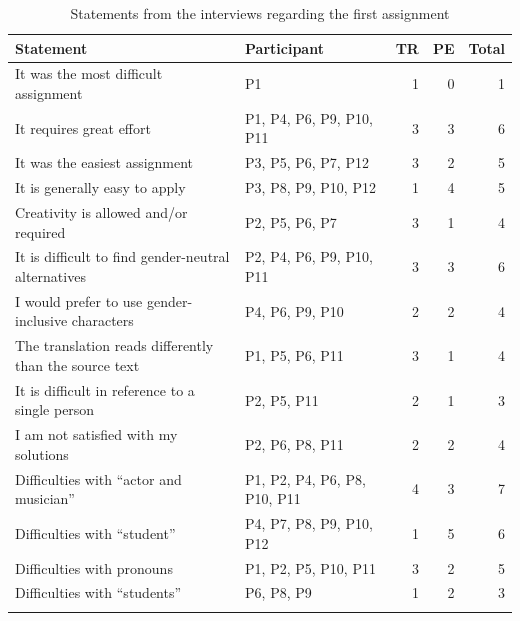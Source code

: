 \begin{table}[ht]
    \caption{Statements from the interviews regarding the first assignment}
    \centering
    \begin{tabularx}{\textwidth}{QQrrr}
 \lsptoprule
        \textbf{Statement} & \textbf{Participant} & \textbf{TR} & \textbf{PE} & \textbf{Total} \\
\midrule
       It was the most difficult assignment & P1 & 1 & 0 & 1 \\
       It requires great effort & P1, P4, P6, P9, P10, P11 & 3 & 3 & 6 \\
       It was the easiest assignment & P3, P5, P6, P7, P12 & 3 & 2 & 5 \\
       It is generally easy to apply & P3, P8, P9, P10, P12 & 1 & 4 & 5 \\
       Creativity is allowed and/or required & P2, P5, P6, P7 & 3 & 1 & 4 \\
       It is difficult to find gender-neutral alternatives & P2, P4, P6, P9, P10, P11 & 3 & 3 & 6 \\
       I would prefer to use gender-inclusive characters & P4, P6, P9, P10 & 2 & 2 & 4 \\
       The translation reads differently than the source text & P1, P5, P6, P11 & 3 & 1 & 4 \\
       It is difficult in reference to a single person & P2, P5, P11 & 2 & 1 & 3 \\
       I am not satisfied with my solutions & P2, P6, P8, P11 & 2 & 2 & 4 \\
       Difficulties with ``actor and musician'' & P1, P2, P4, P6, P8, P10, P11 & 4 & 3 & 7 \\
       Difficulties with ``student'' & P4, P7, P8, P9, P10, P12 & 1 & 5 & 6 \\
       Difficulties with pronouns & P1, P2, P5, P10, P11 & 3 & 2 & 5 \\
       Difficulties with ``students'' & P6, P8, P9 & 1 & 2 & 3 \\
\lspbottomrule
    \end{tabularx}
    \label{tab:interviews_GNR}
\end{table}

